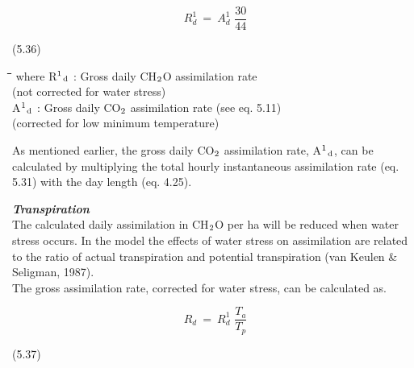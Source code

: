 \documentclass[11pt]{article}
\begin{document}
\begin{displaymath}
R _{d}^{1} ~=~ A _{d}^{1} \,\,{\frac{30}{44}}
\end{displaymath}

 \bigskip
\strut\hfill (5.36)

\nwln
\begin{tabbing}
\hspace{1.27cm}\=\hspace{1.27cm}\=\hspace{1.27cm}\=\hspace{1.27cm}\=%
\hspace{1.27cm}\=\hspace{1.27cm}\=\hspace{1.27cm}\=\hspace{1.27cm}\=%
\hspace{1.27cm}\=\hspace{1.27cm}\=\kill
where\> R$^{{\rm 1}}$$_{{\rm d}}$\> : Gross daily CH$_{{\rm 2}}$O assimilation rate\> \> \> \> \> \> \> \> [kg ha$^{{\rm -1}}$ d$^{{\rm -1}}$]\\
\>\>   (not corrected for water stress)\\
\>A$^{{\rm 1}}$$_{{\rm d}}$\> : Gross daily CO$_{{\rm 2}}$ assimilation rate (see eq. 5.11)\> \> \> \> \> \> \> \> [kg ha$^{{\rm -1}}$ d$^{{\rm -1}}$]\\
\>\>   (corrected for low minimum temperature)
\end{tabbing}

 \bigskip
As mentioned earlier, the gross daily CO$_{{\rm 2}}$ assimilation rate, A$^{{\rm 1}}$$_{{\rm d}}$, can be calculated by
multiply\-ing the total hourly instantaneous assimilation rate (eq. 5.31) with the day length
(eq. 4.25). 

{\bf {\it Transpiration\/}}\\
The calculated daily assimilation in CH$_{{\rm 2}}$O per ha will be reduced when water stress
occurs. In the model the effects of water stress on assimilation are related to the ratio of
actual transpiration and potential transpiration (van Keulen \& Seligman, 1987).\\
The gross assimilation rate, corrected for water stress, can be calculated as.

\begin{displaymath}
R _{d} ~=~ R _{d}^{1} \,\,{\frac{T _{a} }{T _{p} }}
\end{displaymath}

 \bigskip
\strut\hfill (5.37)
\end{document}
